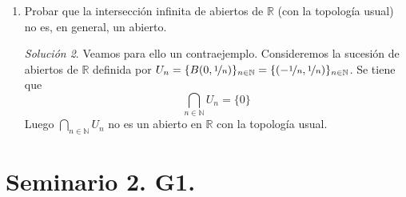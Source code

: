 \documentclass[12pt,twoside]{report}
\theoremstyle{azul}
\theoremstyle{azul2}
\theoremstyle{plain}
\theoremstyle{definition}
\theoremstyle{remark}
\newtheorem*{sol}{Solución}
\begin{document}
\begin{enumerate}
\begin{sol}
\begin{itemize}
    \end{itemize}
    \end{sol}
    \item Probar que la intersecci{\'o}n infinita de abiertos de $\mathbb{R}$ (con la topolog{\'i}a usual) no es, en general, un abierto.
    \begin{sol}
    Veamos para ello un contraejemplo. Consideremos la sucesi{\'o}n de abiertos de $\mathbb{R}$ definida por $U_n = \{B(0,\nicefrac{1}{n})\}_{n \in \mathbb{N}}=\{(-\nicefrac{1}{n},\nicefrac{1}{n})\}_{n \in \mathbb{N}}$. Se tiene que 
    $$\underset{n \in \mathbb{N}}{\bigcap} U_n = \{0\}$$
    Luego $\underset{n \in \mathbb{N}}{\bigcap} U_n$ no es un abierto en $\mathbb{R}$ con la topolog{\'i}a usual.  
    \end{sol}
\end{enumerate}
\section{Seminario 2. G1.}
\end{document}
